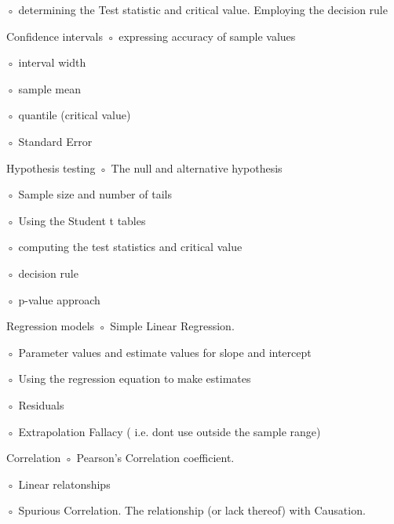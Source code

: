 \documentclass[12pt]{article}
\begin{document}
◦
determining the Test statistic and critical value. Employing the decision rule




Confidence intervals
◦
expressing accuracy of sample values

◦
interval width

◦
sample mean

◦
quantile (critical value)

◦
Standard Error



Hypothesis testing
◦
The null and alternative hypothesis

◦
Sample size and number of tails

◦
Using the Student t tables

◦
computing the test statistics and critical value

◦
decision rule

◦
p-value approach



Regression models
◦
Simple Linear Regression.

◦
Parameter values and estimate values for slope and intercept

◦
Using the regression equation to make estimates

◦
Residuals

◦
Extrapolation Fallacy ( i.e. dont use outside the sample range)



Correlation
◦
Pearson’s Correlation coefficient.

◦
Linear relatonships

◦
Spurious Correlation. The relationship (or lack thereof) with Causation.




    
\end{document}
